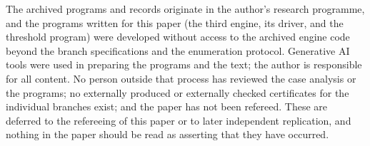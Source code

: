 \documentclass[11pt]{article}
\theoremstyle{definition}
\theoremstyle{remark}
\begin{document}
The archived programs and records originate in the author's research programme, and the programs written for this paper (the third engine, its driver, and the threshold program) were developed without access to the archived engine code beyond the branch specifications and the enumeration protocol. Generative AI tools were used in preparing the programs and the text; the author is responsible for all content. No person outside that process has reviewed the case analysis or the programs; no externally produced or externally checked certificates for the individual branches exist; and the paper has not been refereed. These are deferred to the refereeing of this paper or to later independent replication, and nothing in the paper should be read as asserting that they have occurred.



\end{document}
